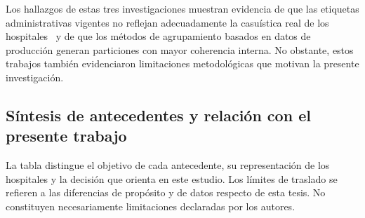 Los hallazgos de estas tres investigaciones muestran evidencia de que las
etiquetas administrativas vigentes no reflejan adecuadamente la
casuística real de los hospitales~\citep{Carlier2020, Giglio2021} y de que los
métodos de agrupamiento basados en datos de producción generan particiones con
mayor coherencia interna. No obstante, estos trabajos también evidenciaron
limitaciones metodológicas que motivan la presente investigación.

\subsection{Síntesis de antecedentes y relación con el presente trabajo}

La tabla distingue el objetivo de cada antecedente, su representación de los
hospitales y la decisión que orienta en este estudio. Los límites de traslado
se refieren a las diferencias de propósito y de datos respecto de esta tesis.
No constituyen necesariamente limitaciones declaradas por los autores.

